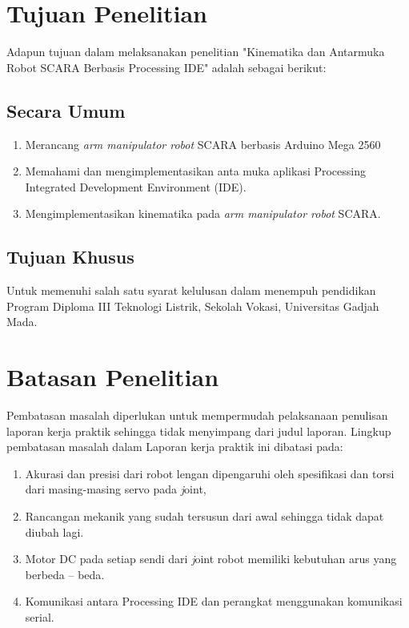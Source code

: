 \section{Tujuan Penelitian}
Adapun tujuan dalam melaksanakan penelitian "Kinematika dan Antarmuka Robot SCARA Berbasis Processing IDE" adalah sebagai berikut:

	\subsection{Secara Umum}
		\begin{enumerate}
		\item Merancang \emph{ arm manipulator robot} SCARA berbasis Arduino Mega 2560
		\item Memahami dan mengimplementasikan anta muka aplikasi Processing Integrated Development Environment (IDE).
		\item Mengimplementasikan kinematika pada \emph{arm manipulator robot} SCARA.
	\end{enumerate}
	\subsection{Tujuan Khusus}
	 Untuk memenuhi salah satu syarat kelulusan dalam menempuh pendidikan Program   Diploma III Teknologi Listrik, Sekolah Vokasi, Universitas Gadjah Mada. 
	
	
\section{Batasan Penelitian}
	Pembatasan masalah diperlukan untuk mempermudah pelaksanaan penulisan laporan kerja praktik sehingga tidak menyimpang dari judul laporan. Lingkup pembatasan masalah dalam Laporan kerja praktik ini dibatasi pada:
	
	\begin{enumerate}
		
		\item Akurasi dan presisi dari robot lengan dipengaruhi oleh spesifikasi dan torsi dari masing-masing servo pada \textit joint,
		\item  Rancangan mekanik yang sudah tersusun dari awal sehingga tidak dapat diubah lagi. 
		\item Motor DC pada setiap sendi dari \textit joint robot memiliki kebutuhan arus yang berbeda – beda. 
		\item Komunikasi antara Processing IDE dan perangkat menggunakan komunikasi serial.
		
	\end{enumerate}

